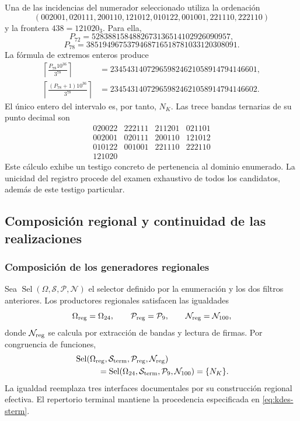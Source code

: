 Una de las incidencias del numerador seleccionado utiliza la ordenación
\[
 (002001,020111,200110,121012,010122,001001,221110,222110)
\]
y la frontera $438=121020_3$. Para ella,
\[
 P_{72}=5283881584882673136514102926090957,
\]
\[
 P_{78}=3851949675379468716518781033120308091.
\]
La fórmula de extremos enteros produce
\begin{align*}
 \left\lceil\frac{P_{78}10^{36}}{3^{78}}\right\rceil
 &=234543140729659824621058914794146601,\\
 \left\lceil\frac{(P_{78}+1)10^{36}}{3^{78}}\right\rceil
 &=234543140729659824621058914794146602.
\end{align*}
El único entero del intervalo es, por tanto, $N_K$. Las trece bandas
ternarias de su punto decimal son
\[
 \begin{array}{rrrr}
 020022&222111&211201&021101\\
 002001&020111&200110&121012\\
 010122&001001&221110&222110\\
 121020&&&
 \end{array}
\]
Este cálculo exhibe un testigo concreto de pertenencia al dominio
enumerado. La unicidad del registro procede del examen exhaustivo de
todos los candidatos, además de este testigo particular.

\subsection{Composición regional y continuidad de las realizaciones}

\subsubsection{Composición de los generadores regionales}

Sea $\operatorname{Sel}(\Omega,\mathcal S,\mathcal P,\mathcal N)$ el
selector definido por la enumeración y los dos filtros anteriores.
Los productores regionales satisfacen las igualdades
\[
 \Omega_{\rm reg}=\Omega_{24},\qquad
 \mathcal P_{\rm reg}=\mathcal P_9,\qquad
 \mathcal N_{\rm reg}=\mathcal N_{100},
\]
donde $\mathcal N_{\rm reg}$ se calcula por extracción de bandas y
lectura de firmas. Por congruencia de funciones,
\begin{equation}
 \begin{split}
 &\operatorname{Sel}(\Omega_{\rm reg},\mathcal S_{\rm term},
                    \mathcal P_{\rm reg},\mathcal N_{\rm reg})\\
 &\hspace{10mm}=
 \operatorname{Sel}(\Omega_{24},\mathcal S_{\rm term},
                    \mathcal P_9,\mathcal N_{100})=\{N_K\}.
 \end{split}
 \label{eq:kdes-composicion}
\end{equation}
La igualdad reemplaza tres interfaces documentales por su construcción
regional efectiva. El repertorio terminal mantiene la procedencia
especificada en \eqref{eq:kdes-sterm}.

